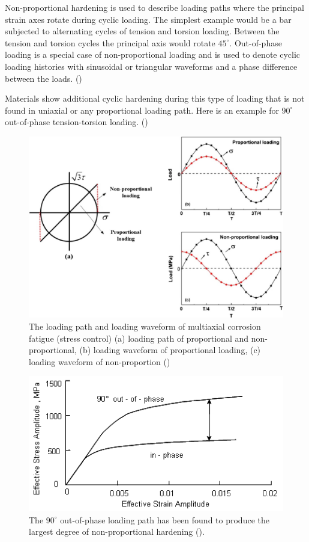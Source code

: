 Non-proportional hardening is used to describe loading paths where the principal strain axes rotate during cyclic loading. The simplest example would be a bar subjected to alternating cycles of tension and torsion loading. Between the tension and torsion cycles the principal axis would rotate $45^\circ$. Out-of-phase loading is a special case of non-proportional loading and is used to denote cyclic loading histories with sinusoidal or triangular waveforms and a phase difference between the loads. (\cite{EFATIGUE})

Materials show additional cyclic hardening during this type of loading that is not found in uniaxial or any proportional loading path. Here is an example for $90^\circ$ out-of-phase tension-torsion loading. ()

\begin{figure}[!h]
	\centering
	\includegraphics[width=\textwidth]{figures//outofphase.jpg} 
	\caption{The loading path and loading waveform of multiaxial corrosion fatigue (stress control) (a) loading path of proportional and non-proportional, (b) loading waveform of proportional loading, (c) loading waveform of non-proportion (\cite{HUANG2017259})}
	\label{fig.outofphase}
\end{figure}

\begin{figure}[!h]
	\centering
	\includegraphics[width=\textwidth]{figures//outofphasestress.png} 
	\caption{The $90^\circ$ out-of-phase loading path has been found to produce the largest degree of non-proportional hardening (\cite{EFATIGUE}). }
	\label{fig.outofphasestress}
\end{figure}

